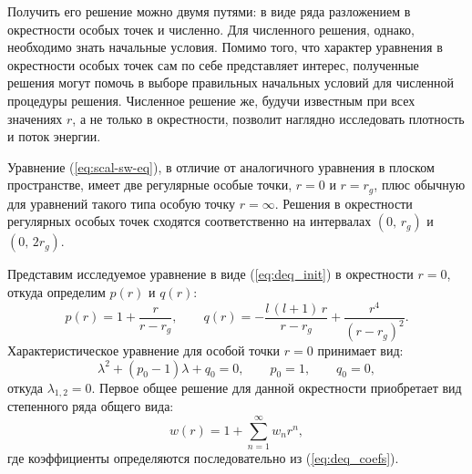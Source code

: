 \documentclass[\docroot/reports/draft/report.tex]{subfiles}
\begin{document}
        Получить его решение можно двумя путями: в виде ряда разложением в окрестности особых точек и численно. Для численного решения, однако, необходимо знать начальные условия. Помимо того, что характер уравнения в окрестности особых точек сам по себе представляет интерес, полученные решения могут помочь в выборе правильных начальных условий для численной процедуры решения. Численное решение же, будучи известным при всех значениях $r$, а не только в окрестности, позволит наглядно исследовать плотность и поток энергии.

        Уравнение (\ref{eq:scal-sw-eq}), в отличие от аналогичного уравнения в плоском пространстве, имеет две регулярные особые точки, $r = 0$ и $r = r_g$, плюс обычную для уравнений такого типа особую точку $r = \infty$. Решения в окрестности регулярных особых точек сходятся соответственно на интервалах $(0,\,r_g)$ и $(0,\,2r_g)$.

        Представим исследуемое уравнение в виде (\ref{eq:deq_init}) в окрестности $r = 0$, откуда определим $p(r)$ и $q(r)$:
        \begin{equation*}
            p(r) = 1 + \frac{r}{r - r_g}, \qquad
            q(r) = -\frac{l\,(l+1)\,r}{r-r_g} + \frac{r^4}{(r-r_g)^2} .
        \end{equation*}
        Характеристическое уравнение для особой точки $r = 0$ принимает вид:
        \begin{equation*}
            \lambda^2 + (p_0 - 1) \lambda + q_0 = 0, \qquad
            p_0 = 1, \qquad q_0 = 0 ,
        \end{equation*}
        откуда $\lambda_{1,2} = 0$. Первое общее решение для данной окрестности приобретает вид степенного ряда общего вида:
        \begin{equation*}
            w(r) = 1 + \sum\limits_{n = 1}^\infty w_n r^n ,
        \end{equation*}
        где коэффициенты определяются последовательно из (\ref{eq:deq_coefs}).
\end{document}
